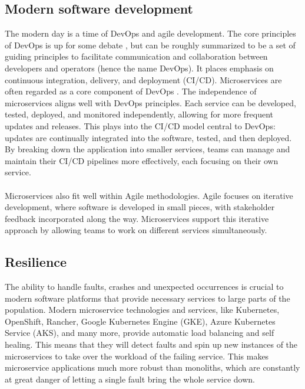 \subsection{Modern software development}
The modern day is a time of DevOps and agile development.
The core principles of DevOps is up for some debate \cite*{Devops-definition}, but can be roughly summarized to be a set of guiding principles to facilitate communication and collaboration between developers and operators (hence the name DevOps). 
It places emphasis on continuous integration, delivery, and deployment (CI/CD). 
Microservices are often regarded as a core component of DevOps \cite*{Devops-amazon}.
The independence of microservices aligns well with DevOps principles. 
Each service can be developed, tested, deployed, and monitored independently, allowing for more frequent updates and releases. 
This plays into the CI/CD model central to DevOps: updates are continually integrated into the software, tested, and then deployed. 
By breaking down the application into smaller services, teams can manage and maintain their CI/CD pipelines more effectively, each focusing on their own service.\\
\\
Microservices also fit well within Agile methodologies. 
Agile focuses on iterative development, where software is developed in small pieces, with stakeholder feedback incorporated along the way. 
Microservices support this iterative approach by allowing teams to work on different services simultaneously.
\subsection{Resilience}
The ability to handle faults, crashes and unexpected occurrences is crucial to modern software platforms that provide necessary services to large parts of the population. 
Modern microservice technologies and services, like Kubernetes, OpenShift, Rancher, Google Kubernetes Engine (GKE), Azure Kubernetes Service (AKS), and many more, provide automatic load balancing and self healing. 
This means that they will detect faults and spin up new instances of the microservices to take over the workload of the failing service. 
This makes microservice applications much more robust than monoliths, which are constantly at great danger of letting a single fault bring the whole service down.

